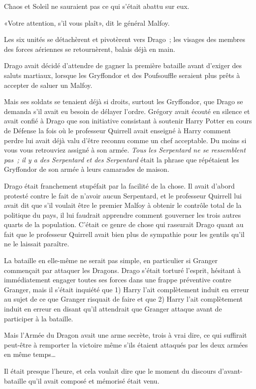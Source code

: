 Chaos et Soleil ne sauraient pas ce qui s'était abattu sur eux.

«Votre attention, s'il vous plaît», dit le général Malfoy.

Les six unités se détachèrent et pivotèrent vers Drago~; les visages des membres des forces aériennes se retournèrent, balais déjà en main.

Drago avait décidé d'attendre de gagner la première bataille avant d'exiger des saluts martiaux, lorsque les Gryffondor et des Poufsouffle seraient plus prêts à accepter de saluer un Malfoy.

Mais ses soldats se tenaient déjà si droits, surtout les Gryffondor, que Drago se demanda s'il avait eu besoin de délayer l'ordre. Grégory avait écouté en silence et avait confié à Drago que son initiative consistant à soutenir Harry Potter en cours de Défense la fois où le professeur Quirrell avait enseigné à Harry comment perdre lui avait déjà valu d'être reconnu comme un chef acceptable. Du moins si vous vous retrouviez assigné à son armée. \emph{Tous les Serpentard ne se ressemblent pas~; il y a des Serpentard et des Serpentard} était la phrase que répétaient les Gryffondor de son armée à leurs camarades de maison.

Drago était franchement stupéfait par la facilité de la chose. Il avait d'abord protesté contre le fait de n'avoir aucun Serpentard, et le professeur Quirrell lui avait dit que s'il voulait être le premier Malfoy à obtenir le contrôle total de la politique du pays, il lui faudrait apprendre comment gouverner les trois autres quarts de la population. C'était ce genre de chose qui rassurait Drago quant au fait que le professeur Quirrell avait bien plus de sympathie pour les gentils qu'il ne le laissait paraître.

La bataille en elle-même ne serait pas simple, en particulier si Granger commençait par attaquer les Dragons. Drago s'était torturé l'esprit, hésitant à immédiatement engager toutes ses forces dans une frappe préventive contre Granger, mais il s'était inquiété que 1) Harry l'ait complètement induit en erreur au sujet de ce que Granger risquait de faire et que 2) Harry l'ait complètement induit en erreur en disant qu'il attendrait que Granger attaque avant de participer à la bataille.

Mais l'Armée du Dragon avait une arme secrète, trois à vrai dire, ce qui suffirait peut-être à remporter la victoire même s'ils étaient attaqués par les deux armées en même temps…

Il était presque l'heure, et cela voulait dire que le moment du discours d'avant-bataille qu'il avait composé et mémorisé était venu.

